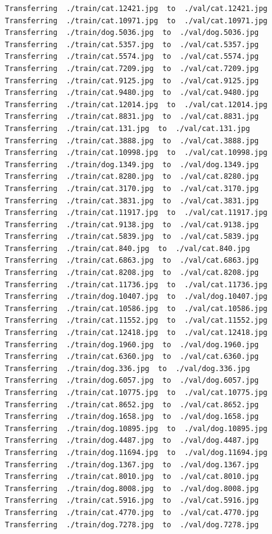 \documentclass[]{book}
\theoremstyle{definition}
\theoremstyle{definition}
\theoremstyle{definition}
\theoremstyle{remark}
\begin{document}
\begin{verbatim}
Transferring  ./train/cat.12421.jpg  to  ./val/cat.12421.jpg
Transferring  ./train/cat.10971.jpg  to  ./val/cat.10971.jpg
Transferring  ./train/dog.5036.jpg  to  ./val/dog.5036.jpg
Transferring  ./train/cat.5357.jpg  to  ./val/cat.5357.jpg
Transferring  ./train/cat.5574.jpg  to  ./val/cat.5574.jpg
Transferring  ./train/cat.7209.jpg  to  ./val/cat.7209.jpg
Transferring  ./train/cat.9125.jpg  to  ./val/cat.9125.jpg
Transferring  ./train/cat.9480.jpg  to  ./val/cat.9480.jpg
Transferring  ./train/cat.12014.jpg  to  ./val/cat.12014.jpg
Transferring  ./train/cat.8831.jpg  to  ./val/cat.8831.jpg
Transferring  ./train/cat.131.jpg  to  ./val/cat.131.jpg
Transferring  ./train/cat.3888.jpg  to  ./val/cat.3888.jpg
Transferring  ./train/cat.10998.jpg  to  ./val/cat.10998.jpg
Transferring  ./train/dog.1349.jpg  to  ./val/dog.1349.jpg
Transferring  ./train/cat.8280.jpg  to  ./val/cat.8280.jpg
Transferring  ./train/cat.3170.jpg  to  ./val/cat.3170.jpg
Transferring  ./train/cat.3831.jpg  to  ./val/cat.3831.jpg
Transferring  ./train/cat.11917.jpg  to  ./val/cat.11917.jpg
Transferring  ./train/cat.9138.jpg  to  ./val/cat.9138.jpg
Transferring  ./train/cat.5839.jpg  to  ./val/cat.5839.jpg
Transferring  ./train/cat.840.jpg  to  ./val/cat.840.jpg
Transferring  ./train/cat.6863.jpg  to  ./val/cat.6863.jpg
Transferring  ./train/cat.8208.jpg  to  ./val/cat.8208.jpg
Transferring  ./train/cat.11736.jpg  to  ./val/cat.11736.jpg
Transferring  ./train/dog.10407.jpg  to  ./val/dog.10407.jpg
Transferring  ./train/cat.10586.jpg  to  ./val/cat.10586.jpg
Transferring  ./train/cat.11552.jpg  to  ./val/cat.11552.jpg
Transferring  ./train/cat.12418.jpg  to  ./val/cat.12418.jpg
Transferring  ./train/dog.1960.jpg  to  ./val/dog.1960.jpg
Transferring  ./train/cat.6360.jpg  to  ./val/cat.6360.jpg
Transferring  ./train/dog.336.jpg  to  ./val/dog.336.jpg
Transferring  ./train/dog.6057.jpg  to  ./val/dog.6057.jpg
Transferring  ./train/cat.10775.jpg  to  ./val/cat.10775.jpg
Transferring  ./train/cat.8652.jpg  to  ./val/cat.8652.jpg
Transferring  ./train/dog.1658.jpg  to  ./val/dog.1658.jpg
Transferring  ./train/dog.10895.jpg  to  ./val/dog.10895.jpg
Transferring  ./train/dog.4487.jpg  to  ./val/dog.4487.jpg
Transferring  ./train/dog.11694.jpg  to  ./val/dog.11694.jpg
Transferring  ./train/dog.1367.jpg  to  ./val/dog.1367.jpg
Transferring  ./train/cat.8010.jpg  to  ./val/cat.8010.jpg
Transferring  ./train/dog.8008.jpg  to  ./val/dog.8008.jpg
Transferring  ./train/cat.5916.jpg  to  ./val/cat.5916.jpg
Transferring  ./train/cat.4770.jpg  to  ./val/cat.4770.jpg
Transferring  ./train/dog.7278.jpg  to  ./val/dog.7278.jpg

\end{verbatim}
\end{document}
